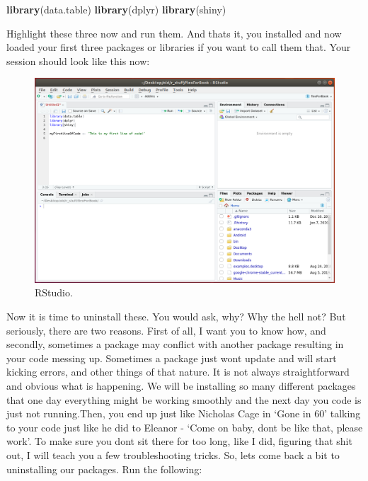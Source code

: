 \documentclass[]{book}
\newenvironment{Shaded}{\begin{snugshade}}{\end{snugshade}}
\newcommand{\KeywordTok}[1]{\textcolor[rgb]{0.13,0.29,0.53}{\textbf{#1}}}
\newcommand{\NormalTok}[1]{#1}
\begin{document}
\begin{Shaded}
\begin{Highlighting}[]
  \KeywordTok{library}\NormalTok{(data.table)}
  \KeywordTok{library}\NormalTok{(dplyr)}
  \KeywordTok{library}\NormalTok{(shiny)}
\end{Highlighting}
\end{Shaded}

Highlight these three now and run them. And thats it, you installed and now loaded your first three packages or libraries if you want to call them that. Your session should look like this now:

\begin{figure}
\centering
\includegraphics{rstudio10.png}
\caption{RStudio.}
\end{figure}

Now it is time to uninstall these. You would ask, why? Why the hell not? But seriously, there are two reasons. First of all, I want you to know how, and secondly, sometimes a package may conflict with another package resulting in your code messing up. Sometimes a package just wont update and will start kicking errors, and other things of that nature. It is not always straightforward and obvious what is happening. We will be installing so many different packages that one day everything might be working smoothly and the next day you code is just not running.Then, you end up just like Nicholas Cage in `Gone in 60' talking to your code just like he did to Eleanor - `Come on baby, dont be like that, please work'. To make sure you dont sit there for too long, like I did, figuring that shit out, I will teach you a few troubleshooting tricks. So, lets come back a bit to uninstalling our packages. Run the following:
\end{document}
